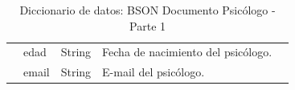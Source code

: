 \begin{table}[htpb]
\begin{tabularx}{\textwidth}{|l|X|X|X|X|}
                                     & edad                                                                                           & String                                                             & Fecha de nacimiento del psicólogo.                                                                                                                                                                                                                                          \\ \cline{2-4} 
                                     & email                                                                                          & String                                                             & E-mail del psicólogo.                                                                                                                                                                                                                                                       \\ \hline
\end{tabularx}
\caption{Diccionario de datos: BSON Documento Psicólogo - Parte 1}
\label{fig:dic_datos_BSON_4}
\end{table}

